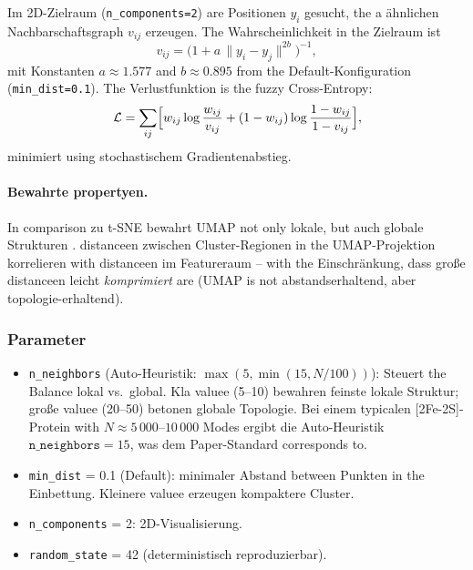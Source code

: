 \documentclass[11pt,a4paper,twoside]{article}
\theoremstyle{remark}
\begin{document}
Im 2D-Zielraum (\texttt{n\_components=2}) are Positionen $y_i$
gesucht, the a \"ahnlichen Nachbarschaftsgraph $v_{ij}$ erzeugen.
The Wahrscheinlichkeit in the Zielraum ist
\begin{equation}
  v_{ij} = \bigl(1 + a\,\|y_i - y_j\|^{2b}\bigr)^{-1},
\end{equation}
mit Konstanten $a \approx 1.577$ and $b \approx 0.895$ from the
Default-Konfiguration (\texttt{min\_dist=0.1}). The Verlustfunktion
is the fuzzy Cross-Entropy:
\begin{equation}
  \mathcal{L} = \sum_{ij} \Bigl[w_{ij}\log\frac{w_{ij}}{v_{ij}}
              + (1 - w_{ij})\log\frac{1 - w_{ij}}{1 - v_{ij}}\Bigr],
  \label{eq:umap-loss}
\end{equation}
minimiert using stochastischem Gradientenabstieg.

\paragraph{Bewahrte propertyen.}

In comparison zu t-SNE bewahrt UMAP not only lokale, but auch
globale Strukturen \cite{Becht2019}. distanceen zwischen
Cluster-Regionen in the UMAP-Projektion korrelieren with distanceen im
Featureraum -- with the Einschr\"ankung, dass gro\ss e distanceen leicht
\emph{komprimiert} are (UMAP is not abstandserhaltend, aber
topologie-erhaltend).

\subsubsection*{Parameter}

\begin{itemize}
  \item \texttt{n\_neighbors} (Auto-Heuristik:
        $\max(5, \min(15, N/100))$): Steuert the Balance lokal vs.\
        global. Kla valuee (5--10) bewahren feinste lokale Struktur;
        gro\ss e valuee (20--50) betonen globale Topologie. Bei einem
        typicalen [2Fe-2S]-Protein with $N \approx 5\,000$--$10\,000$ Modes ergibt die
        Auto-Heuristik $\texttt{n\_neighbors} = 15$, was dem
        Paper-Standard \cite{McInnes2018} corresponds to.

  \item \texttt{min\_dist} = 0.1 (Default): minimaler Abstand
        between Punkten in the Einbettung. Kleinere valuee erzeugen
        kompaktere Cluster.

  \item \texttt{n\_components} = 2: 2D-Visualisierung.

  \item \texttt{random\_state} = 42 (deterministisch reproduzierbar).
\end{itemize}
\end{document}
